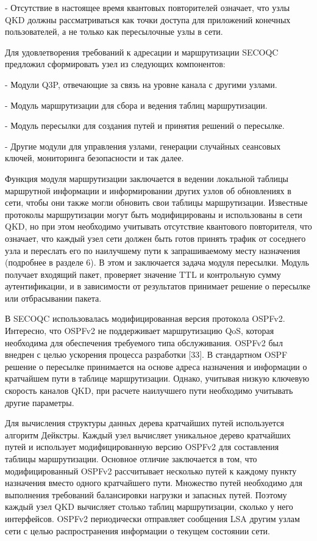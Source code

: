 - Отсутствие в настоящее время квантовых повторителей означает, что узлы QKD должны рассматриваться как точки доступа для приложений конечных пользователей, а не только как пересылочные узлы в сети.

Для удовлетворения требований к адресации и маршрутизации SECOQC предложил сформировать узел из следующих компонентов:

- Модули Q3P, отвечающие за связь на уровне канала с другими узлами.

- Модуль маршрутизации для сбора и ведения таблиц маршрутизации.

- Модуль пересылки для создания путей и принятия решений о пересылке.

- Другие модули для управления узлами, генерации случайных сеансовых ключей, мониторинга безопасности и так далее.

Функция модуля маршрутизации заключается в ведении локальной таблицы маршрутной информации и информировании других узлов об обновлениях в сети, чтобы они также могли обновить свои таблицы маршрутизации. Известные протоколы маршрутизации могут быть модифицированы и использованы в сети QKD, но при этом необходимо учитывать отсутствие квантового повторителя, что означает, что каждый узел сети должен быть готов принять трафик от соседнего узла и переслать его по наилучшему пути к запрашиваемому месту назначения (подробнее в разделе 6). В этом и заключается задача модуля пересылки. Модуль получает входящий пакет, проверяет значение TTL и контрольную сумму аутентификации, и в зависимости от результатов принимает решение о пересылке или отбрасывании пакета.

В SECOQC использовалась модифицированная версия протокола OSPFv2. Интересно, что OSPFv2 не поддерживает маршрутизацию QoS, которая необходима для обеспечения требуемого типа обслуживания. OSPFv2 был внедрен с целью ускорения процесса разработки [33]. В стандартном OSPF решение о пересылке принимается на основе адреса назначения и информации о кратчайшем пути в таблице маршрутизации. Однако, учитывая низкую ключевую скорость каналов QKD, при расчете наилучшего пути необходимо учитывать другие параметры.


Для вычисления структуры данных дерева кратчайших путей используется алгоритм Дейкстры. Каждый узел вычисляет уникальное дерево кратчайших путей и использует модифицированную версию OSPFv2 для составления таблицы маршрутизации. Основное отличие заключается в том, что модифицированный OSPFv2 рассчитывает несколько путей к каждому пункту назначения вместо одного кратчайшего пути. Множество путей необходимо для выполнения требований балансировки нагрузки и запасных путей. Поэтому каждый узел QKD вычисляет столько таблиц маршрутизации, сколько у него интерфейсов. OSPFv2 периодически отправляет сообщения LSA другим узлам сети с целью распространения информации о текущем состоянии сети.

